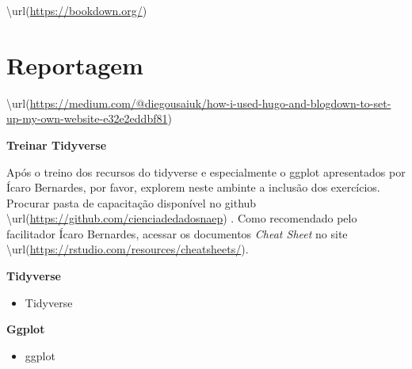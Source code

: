 \documentclass[
]{book}
\providecommand{\tightlist}{%
  \setlength{\itemsep}{0pt}\setlength{\parskip}{0pt}}
\begin{document}
\textbackslash url(\url{https://bookdown.org/})

\hypertarget{reportagem}{%
\section{Reportagem}\label{reportagem}}

\textbackslash url(\url{https://medium.com/@diegousaiuk/how-i-used-hugo-and-blogdown-to-set-up-my-own-website-e32e2eddbf81})

\textbf{Treinar Tidyverse}

Após o treino dos recursos do tidyverse e
especialmente o ggplot apresentados por
Ícaro Bernardes, por favor,
explorem neste ambinte a inclusão dos exercícios.
Procurar pasta de capacitação disponível no github
\textbackslash url(\url{https://github.com/cienciadedadosnaep}) .
Como recomendado pelo facilitador Ícaro Bernardes,
acessar os documentos \emph{Cheat Sheet} no site
\textbackslash url(\url{https://rstudio.com/resources/cheatsheets/}).

\textbf{Tidyverse}

\begin{itemize}
\tightlist
\item
  Tidyverse
\end{itemize}

\textbf{Ggplot}

\begin{itemize}
\tightlist
\item
  ggplot
\end{itemize}

  
\end{document}
